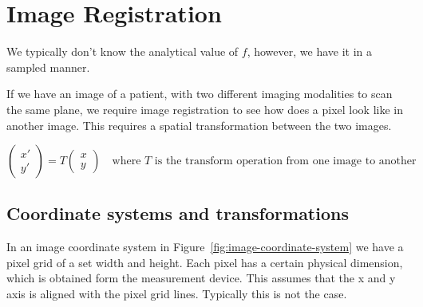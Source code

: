 \documentclass[11pt]{article}
\begin{document}


\tableofcontents

\clearpage

\section{Image Registration}

\begin{figure}[H]
    \centering
\end{figure}

We typically don't know the analytical value of $f$, however, we have it in a sampled manner. 

If we have an image of a patient, with two different imaging modalities to scan the same plane, we require image registration to see how does a pixel look like in another image. This requires a spatial transformation between the two images. 

\begin{equation*}
    \begin{pmatrix}
        x' \\ y'
    \end{pmatrix}
    =
    T 
    \begin{pmatrix}
        x \\ y
    \end{pmatrix} \quad \text{where $T$ is the transform operation from one image to another}
\end{equation*}

\subsection{Coordinate systems and transformations}

\begin{figure}[H]
    \centering
\end{figure}

In an image coordinate system in Figure~\ref{fig:image-coordinate-system} we have a pixel grid of a set width and height. Each pixel has a certain physical dimension, which is obtained form the measurement device. This assumes that the x and y axis is aligned with the pixel grid lines. Typically this is not the case.
\end{document}
